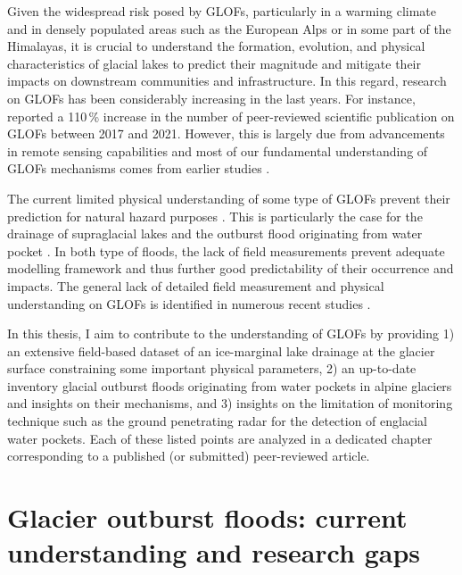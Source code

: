 Given the widespread risk posed by GLOFs, particularly in a warming climate and in densely populated areas such as the European Alps or in some part of the Himalayas, it is crucial to understand the formation, evolution, and physical characteristics of glacial lakes to predict their magnitude and mitigate their impacts on downstream communities and infrastructure. In this regard, research on GLOFs has been considerably increasing in the last years. For instance, \cite{Emmer&al2022} reported a 110\,\% increase in the number of peer-reviewed scientific publication on GLOFs between 2017 and 2021. However, this is largely due from advancements in remote sensing capabilities and most of our fundamental understanding of GLOFs mechanisms comes from earlier studies \citep[see][for a review]{Bjornsson2010}.

The current limited physical understanding of some type of GLOFs prevent their prediction for natural hazard purposes \citep{Emmer&al2022}. This is particularly the case for the drainage of supraglacial lakes \citep[e.g.][]{Vincent&al2010} and the outburst flood originating from water pocket \citep[e.g.][]{Haeberli1983}. In both type of floods, the lack of field measurements prevent adequate modelling framework and thus further good predictability of their occurrence and impacts. The general lack of detailed field measurement and physical understanding on GLOFs is identified in numerous recent studies \citep{Zhang&al2024, Carrivick&Tweed2016, Veh&al2022}.

In this thesis, I aim to contribute to the understanding of GLOFs by providing 1) an extensive field-based dataset of an ice-marginal lake drainage at the glacier surface constraining some important physical parameters, 2) an up-to-date inventory glacial outburst floods originating from water pockets in alpine glaciers and insights on their mechanisms, and 3) insights on the limitation of monitoring technique such as the ground penetrating radar for the detection of englacial water pockets. Each of these listed points are analyzed in a dedicated chapter corresponding to a published (or submitted) peer-reviewed article.


\section{Glacier outburst floods: current understanding and research gaps} 

